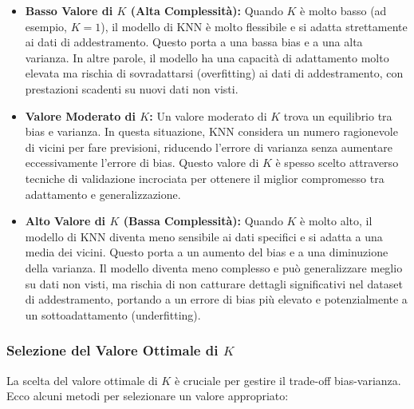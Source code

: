 \begin{itemize}
    \item \textbf{Basso Valore di \( K \) (Alta Complessità):} Quando \( K \) è molto basso (ad esempio, \( K = 1 \)), il modello di KNN è molto flessibile e si adatta strettamente ai dati di addestramento. Questo porta a una bassa bias e a una alta varianza. In altre parole, il modello ha una capacità di adattamento molto elevata ma rischia di sovradattarsi (overfitting) ai dati di addestramento, con prestazioni scadenti su nuovi dati non visti.

    \item \textbf{Valore Moderato di \( K \):} Un valore moderato di \( K \) trova un equilibrio tra bias e varianza. In questa situazione, KNN considera un numero ragionevole di vicini per fare previsioni, riducendo l'errore di varianza senza aumentare eccessivamente l'errore di bias. Questo valore di \( K \) è spesso scelto attraverso tecniche di validazione incrociata per ottenere il miglior compromesso tra adattamento e generalizzazione.

    \item \textbf{Alto Valore di \( K \) (Bassa Complessità):} Quando \( K \) è molto alto, il modello di KNN diventa meno sensibile ai dati specifici e si adatta a una media dei vicini. Questo porta a un aumento del bias e a una diminuzione della varianza. Il modello diventa meno complesso e può generalizzare meglio su dati non visti, ma rischia di non catturare dettagli significativi nel dataset di addestramento, portando a un errore di bias più elevato e potenzialmente a un sottoadattamento (underfitting).

\end{itemize}

\subsubsection{Selezione del Valore Ottimale di \( K \)}

La scelta del valore ottimale di \( K \) è cruciale per gestire il trade-off bias-varianza. Ecco alcuni metodi per selezionare un valore appropriato:

